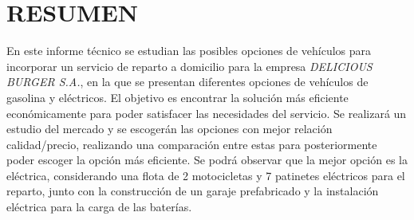 \section*{\hfill RESUMEN}  
En este informe técnico se estudian las posibles opciones de vehículos para incorporar un servicio de reparto a domicilio para la empresa \textit{DELICIOUS BURGER S.A.}, en la que se presentan diferentes opciones de vehículos de gasolina y eléctricos. El objetivo es encontrar la solución más eficiente económicamente para poder satisfacer las necesidades del servicio. Se realizará un estudio del mercado y se escogerán las opciones con mejor relación calidad/precio, realizando una comparación entre estas para posteriormente poder escoger la opción más eficiente. Se podrá observar que la mejor opción es la eléctrica, considerando una flota de 2 motocicletas y 7 patinetes eléctricos para el reparto, junto con la construcción de un garaje prefabricado y la instalación eléctrica para la carga de las baterías.

